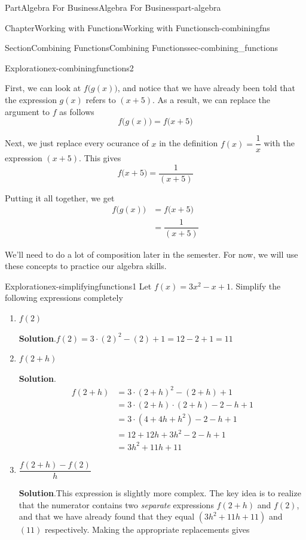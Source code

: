 \documentclass[oneside,10pt,]{tufte-book}
\newcommand{\blocktitlefont}{\relax}
\numberwithin{equation}{chapter}
\newcommand{\amp}{&}
\begin{document}
\begin{partptx}{Part}{Algebra For Business}{}{Algebra For Business}{}{}{part-algebra}
\begin{chapterptx}{Chapter}{Working with Functions}{}{Working with Functions}{}{}{ch-combiningfns}
\begin{sectionptx}{Section}{Combining Functions}{}{Combining Functions}{}{}{sec-combining_functions}
\begin{exploration}{Exploration}{}{ex-combiningfunctions2}
\par
First, we can look at \(f\Big(g(x)\Big)\), and notice that we have already been told  that the expression \(g(x)\) refers to \((x+5)\).  As a result, we can replace the argument to \(f\) as follows%
\begin{equation*}
f\Big(g(x)\Big)  = f\Big( x+5 \Big) 
\end{equation*}
%
\par
Next, we just replace every ocurance of \(x\) in the definition \(f(x) = \dfrac{1}{x}\) with the expression \((x+5)\).  This gives%
\begin{equation*}
f\Big(x+5\Big)  = \dfrac{1}{( x+5)} 
\end{equation*}
%
\par
Putting it all together, we get%
\begin{align*}
f\Big(g(x)\Big)  \amp= f\Big( x+5 \Big)  \\
\amp= \dfrac{1}{( x+5)}  
\end{align*}
%
\end{exploration}%
We'll need to do a lot of composition later in the semester. For now, we will use these concepts to practice our algebra skills.%
\begin{exploration}{Exploration}{}{ex-simplifyingfunctions1}%
Let \(f(x) = 3x^2 - x + 1\). Simplify the following expressions completely%
\begin{enumerate}[font=\bfseries,label=(\alph*),ref=\alph*]%
\item{}\(f(2)\)%
\par\smallskip%
\noindent\textbf{\blocktitlefont Solution}.\hypertarget{ex-simplifyingfunctions1-2-2}{}\quad{}\(f(2) = 3\cdot (2)^2 - (2) + 1 = 12 - 2 + 1 = 11\)%
\item{}\(f(2+h)\)%
\par\smallskip%
\noindent\textbf{\blocktitlefont Solution}.\hypertarget{ex-simplifyingfunctions1-3-2}{}\quad{}%
\begin{align*}
f(2+h) \amp = 3\cdot (2+h)^2 - (2+h) + 1\\
\amp = 3\cdot (2+h)\cdot (2 + h) - 2 - h + 1\\
\amp = 3\cdot (4 + 4h + h^2) - 2 - h + 1\\
\amp = 12 + 12h + 3h^2 - 2 - h + 1\\
\amp = 3h^2 + 11h + 11
\end{align*}
%
\item{}\(\dfrac{f(2+h)-f(2)}{h}\)%
\par\smallskip%
\noindent\textbf{\blocktitlefont Solution}.\hypertarget{ex-simplifyingfunctions1-4-2}{}\quad{}This expression is slightly more complex.  The key idea is to realize that the numerator contains two \emph{separate} expressions \(f(2+h)\) and \(f(2)\), and that we have already found that they equal \((3h^2+11h+11)\) and \((11)\) respectively.  Making the appropriate replacements gives%

\end{enumerate}
\end{exploration}
\end{sectionptx}
\end{chapterptx}
\end{partptx}
\end{document}
